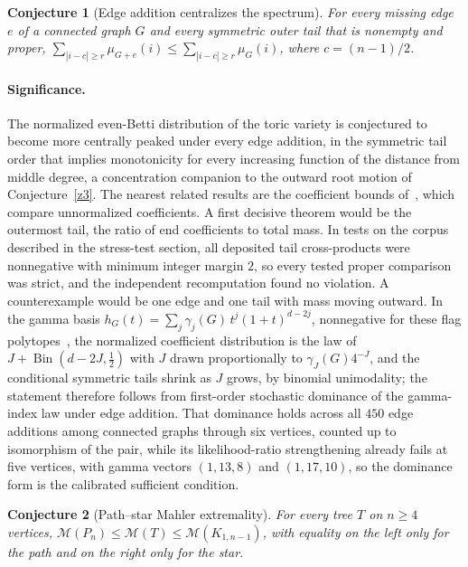 \documentclass[11pt]{article}
\newtheorem{conjecture}{Conjecture}
\theoremstyle{definition}
\begin{document}
\begin{conjecture}[Edge addition centralizes the spectrum]\label{z4}
For every missing edge $e$ of a connected graph $G$ and every symmetric outer tail that is nonempty and proper, $\sum_{|i-c|\ge r}\mu_{G+e}(i)\le\sum_{|i-c|\ge r}\mu_G(i)$, where $c=(n-1)/2$.
\end{conjecture}

\paragraph{Significance.}
The normalized even-Betti distribution of the toric variety is conjectured to become more centrally peaked under every edge addition, in the symmetric tail order that implies monotonicity for every increasing function of the distance from middle degree, a concentration companion to the outward root motion of Conjecture~\ref{z3}.  The nearest related results are the coefficient bounds of~\cite{BV10}, which compare unnormalized coefficients.  A first decisive theorem would be the outermost tail, the ratio of end coefficients to total mass.  In tests on the corpus described in the stress-test section, all deposited tail cross-products were nonnegative with minimum integer margin $2$, so every tested proper comparison was strict, and the independent recomputation found no violation.  A counterexample would be one edge and one tail with mass moving outward.  In the gamma basis $h_G(t)=\sum_j\gamma_j(G)\,t^j(1+t)^{d-2j}$, nonnegative for these flag polytopes~\cite{BV10}, the normalized coefficient distribution is the law of $J+\operatorname{Bin}(d-2J,\tfrac12)$ with $J$ drawn proportionally to $\gamma_J(G)4^{-J}$, and the conditional symmetric tails shrink as $J$ grows, by binomial unimodality; the statement therefore follows from first-order stochastic dominance of the gamma-index law under edge addition.  That dominance holds across all $450$ edge additions among connected graphs through six vertices, counted up to isomorphism of the pair, while its likelihood-ratio strengthening already fails at five vertices, with gamma vectors $(1,13,8)$ and $(1,17,10)$, so the dominance form is the calibrated sufficient condition.

\begin{conjecture}[Path--star Mahler extremality]\label{z5}
For every tree $T$ on $n\ge4$ vertices, $\mathcal M(P_n)\le\mathcal M(T)\le\mathcal M(K_{1,n-1})$, with equality on the left only for the path and on the right only for the star.
\end{conjecture}
\end{document}
